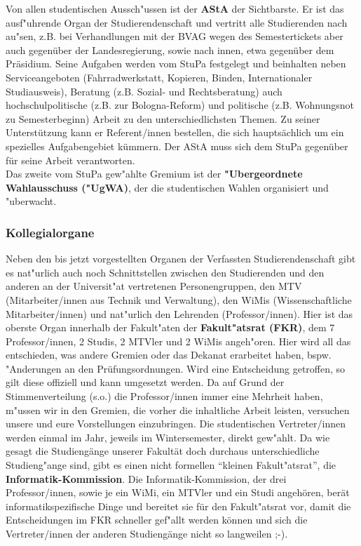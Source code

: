 Von allen studentischen Aussch"ussen ist der \textbf{AStA}  der
Sichtbarste. Er ist das ausf"uhrende Organ der 
Studierendenschaft und vertritt alle Studierenden nach au"sen, z.B. bei 
Verhandlungen mit der BVAG wegen des Semestertickets aber auch gegenüber der 
Landesregierung, sowie nach innen, etwa gegenüber dem Präsidium. Seine Aufgaben werden vom 
StuPa festgelegt und beinhalten neben Serviceangeboten (Fahrradwerkstatt, Kopieren, Binden, 
Internationaler Studiausweis), Beratung (z.B. Sozial- und Rechtsberatung) auch hochschulpolitische 
(z.B. zur Bologna-Reform) und politische (z.B. Wohnungsnot zu Semesterbeginn) Arbeit zu den 
unterschiedlichsten Themen. Zu seiner Unterstützung kann er Referent/innen 
bestellen, die sich hauptsächlich um ein spezielles Aufgabengebiet kümmern.
Der AStA muss sich dem StuPa gegenüber für seine Arbeit verantworten.\\
Das zweite vom StuPa gew"ahlte Gremium ist der \textbf{"Ubergeordnete 
Wahlausschuss ("UgWA)}, der die studentischen Wahlen organisiert und "uberwacht.

\subsubsection*{Kollegialorgane}

Neben den bis jetzt vorgestellten Organen der Verfassten Studierendenschaft 
gibt es nat"urlich auch noch Schnittstellen zwischen den Studierenden und den anderen 
an der Universit"at vertretenen Personengruppen, den MTV (Mitarbeiter/innen 
aus Technik und Verwaltung), den WiMis (Wissenschaftliche Mitarbeiter/innen) und nat"urlich den Lehrenden (Professor/innen). Hier ist das 
oberste Organ innerhalb der Fakult"aten der \textbf{Fakult"atsrat (FKR)}, 
dem 7 Professor/innen, 2 Studis, 2 MTVler und 2 WiMis angeh"oren. Hier wird all das 
entschieden, was andere Gremien oder das Dekanat erarbeitet haben, bspw. 
"Anderungen an den Prüfungsordnungen. Wird eine Entscheidung getroffen, so gilt diese offiziell und kann umgesetzt werden. Da auf Grund der 
Stimmenverteilung (s.o.) die Professor/innen immer eine Mehrheit haben, m"ussen wir 
in den Gremien, die vorher die inhaltliche Arbeit leisten, versuchen unsere 
und eure Vorstellungen einzubringen. Die studentischen 
Vertreter/innen werden einmal im Jahr, jeweils im Wintersemester, direkt gew"ahlt. Da 
wie gesagt die Studiengänge unserer Fakultät doch durchaus unterschiedliche 
Studieng"ange sind, gibt es einen nicht formellen "`kleinen Fakult"atsrat"', 
die \textbf{Informatik-Kommission}. Die Informatik-Kommission, der drei Professor/innen, 
sowie je ein WiMi, ein MTVler und ein Studi angehören, berät informatikspezifische Dinge und 
bereitet sie für den Fakult"atsrat vor, damit die Entscheidungen im FKR 
schneller gef"allt werden können und sich die Vertreter/innen der anderen Studiengänge nicht so langweilen 
;-).

